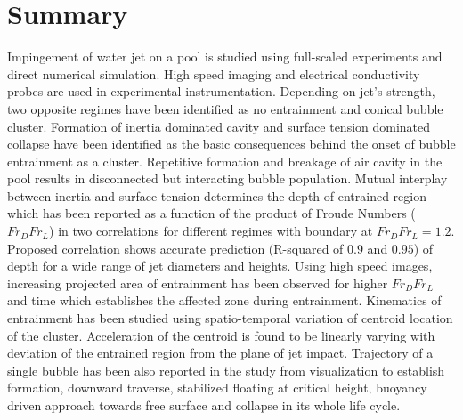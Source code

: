 \section{Summary}
Impingement of water jet on a pool is studied using full-scaled experiments and direct numerical simulation. High speed imaging and electrical conductivity probes are used in experimental instrumentation. Depending on jet's strength, two opposite regimes have been identified as no entrainment and conical bubble cluster. Formation of inertia dominated cavity and surface tension dominated collapse have been identified as the basic consequences behind the onset of bubble entrainment as a cluster. Repetitive formation and breakage of air cavity in the pool results in disconnected but interacting bubble population. Mutual interplay between inertia and surface tension determines the depth of entrained region which has been reported as a function of the product of Froude Numbers  ($Fr_DFr_L$) in two correlations for different regimes with boundary at $Fr_DFr_L = 1.2$. Proposed correlation shows accurate prediction (R-squared of $0.9$ and $0.95$) of depth for a wide range of jet diameters and heights. Using high speed images, increasing projected area of entrainment has been observed for higher $Fr_DFr_L$ and time which establishes the affected zone during entrainment. Kinematics of entrainment has been studied using spatio-temporal variation of centroid location of the cluster. Acceleration of the centroid is found to be linearly varying with deviation of the entrained region from the plane of jet impact. Trajectory of a single bubble has been also reported in the study from visualization to establish formation, downward traverse, stabilized floating at critical height, buoyancy driven approach towards free surface and collapse in its whole life cycle.
